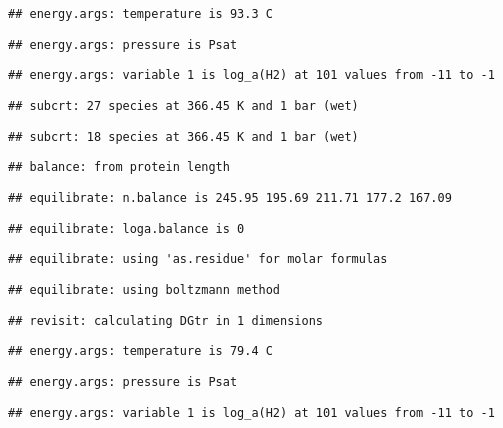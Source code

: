 \documentclass[]{article}
\begin{document}
\begin{verbatim}
## energy.args: temperature is 93.3 C
\end{verbatim}

\begin{verbatim}
## energy.args: pressure is Psat
\end{verbatim}

\begin{verbatim}
## energy.args: variable 1 is log_a(H2) at 101 values from -11 to -1
\end{verbatim}

\begin{verbatim}
## subcrt: 27 species at 366.45 K and 1 bar (wet)
\end{verbatim}

\begin{verbatim}
## subcrt: 18 species at 366.45 K and 1 bar (wet)
\end{verbatim}

\begin{verbatim}
## balance: from protein length
\end{verbatim}

\begin{verbatim}
## equilibrate: n.balance is 245.95 195.69 211.71 177.2 167.09
\end{verbatim}

\begin{verbatim}
## equilibrate: loga.balance is 0
\end{verbatim}

\begin{verbatim}
## equilibrate: using 'as.residue' for molar formulas
\end{verbatim}

\begin{verbatim}
## equilibrate: using boltzmann method
\end{verbatim}

\begin{verbatim}
## revisit: calculating DGtr in 1 dimensions
\end{verbatim}

\begin{verbatim}
## energy.args: temperature is 79.4 C
\end{verbatim}

\begin{verbatim}
## energy.args: pressure is Psat
\end{verbatim}

\begin{verbatim}
## energy.args: variable 1 is log_a(H2) at 101 values from -11 to -1
\end{verbatim}
\end{document}

